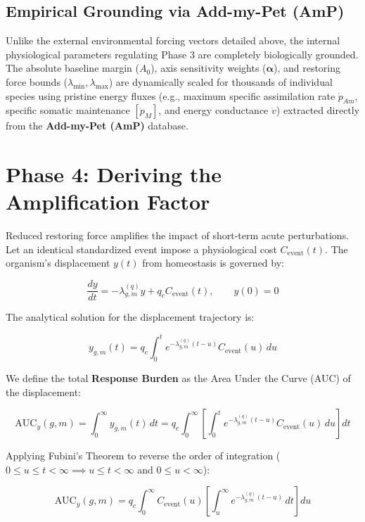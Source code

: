 \documentclass[11pt,a4paper]{article}
\begin{document}
\subsection*{Empirical Grounding via Add-my-Pet (AmP)}
Unlike the external environmental forcing vectors detailed above, the internal physiological parameters regulating Phase 3 are completely biologically grounded. The absolute baseline margin ($A_0$), axis sensitivity weights ($\bm{\alpha}$), and restoring force bounds ($\lambda_{\min}, \lambda_{\max}$) are dynamically scaled for thousands of individual species using pristine energy fluxes (e.g., maximum specific assimilation rate $\dot{p}_{Am}$, specific somatic maintenance $[\dot{p}_M]$, and energy conductance $\dot{v}$) extracted directly from the \textbf{Add-my-Pet (AmP)} database.

\section{Phase 4: Deriving the Amplification Factor}

Reduced restoring force amplifies the impact of short-term acute perturbations. Let an identical standardized event impose a physiological cost $C_{\mathrm{event}}(t)$. The organism's displacement $y(t)$ from homeostasis is governed by:

\begin{equation}
\frac{dy}{dt} = -\lambda_{g,m}^{(q)}y + q_c C_{\mathrm{event}}(t), \qquad y(0)=0
\end{equation}

The analytical solution for the displacement trajectory is:

\begin{equation}
 y_{g,m}(t) = q_c \int_0^t e^{-\lambda_{g,m}^{(q)}(t-u)}C_{\mathrm{event}}(u)\,du
\end{equation}

We define the total \textbf{Response Burden} as the Area Under the Curve (AUC) of the displacement:

\begin{equation}
\text{AUC}_y(g,m) = \int_0^\infty y_{g,m}(t)\,dt = q_c \int_0^\infty \left[ \int_0^t e^{-\lambda_{g,m}^{(q)}(t-u)}C_{\mathrm{event}}(u)\,du \right] dt
\end{equation}

Applying Fubini's Theorem to reverse the order of integration ($0 \le u \le t < \infty \implies u \le t < \infty$ and $0 \le u < \infty$):

\begin{equation}
\text{AUC}_y(g,m) = q_c \int_0^\infty C_{\mathrm{event}}(u) \left[ \int_u^\infty e^{-\lambda_{g,m}^{(q)}(t-u)}\,dt \right] du
\end{equation}
\end{document}
